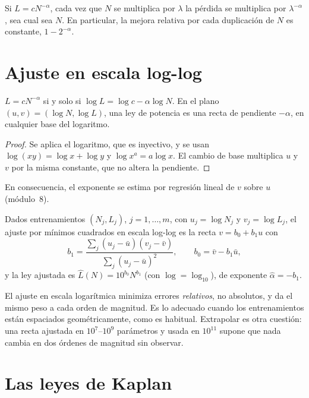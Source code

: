 \begin{corolario}\label{cor:factor}
Si $L=cN^{-\alpha}$, cada vez que $N$ se multiplica por $\lambda$ la pérdida se multiplica por $\lambda^{-\alpha}$, sea cual sea $N$. En particular, la mejora relativa por cada duplicación de $N$ es constante, $1-2^{-\alpha}$.
\end{corolario}

\section{Ajuste en escala log-log}

\begin{proposicion}\label{prop:loglog}
$L=cN^{-\alpha}$ si y solo si $\log L=\log c-\alpha\log N$. En el plano $(u,v)=(\log N,\log L)$, una ley de potencia es una recta de pendiente $-\alpha$, en cualquier base del logaritmo.
\end{proposicion}

\begin{proof}
Se aplica el logaritmo, que es inyectivo, y se usan $\log(xy)=\log x+\log y$ y $\log x^{a}=a\log x$. El cambio de base multiplica $u$ y $v$ por la misma constante, que no altera la pendiente.
\end{proof}

En consecuencia, el exponente se estima por regresión lineal de $v$ sobre $u$ (módulo~8).

\begin{definicion}\label{def:ajuste}
Dados entrenamientos $(N_j,L_j)$, $j=1,\dots,m$, con $u_j=\log N_j$ y $v_j=\log L_j$, el ajuste por mínimos cuadrados en escala log-log es la recta $v=b_0+b_1u$ con
\[
b_1=\frac{\sum_j(u_j-\bar u)(v_j-\bar v)}{\sum_j(u_j-\bar u)^{2}},\qquad b_0=\bar v-b_1\bar u,
\]
y la ley ajustada es $\hat L(N)=10^{b_0}N^{b_1}$ (con $\log=\log_{10}$), de exponente $\hat\alpha=-b_1$.
\end{definicion}

\begin{observacion}
El ajuste en escala logarítmica minimiza errores \emph{relativos}, no absolutos, y da el mismo peso a cada orden de magnitud. Es lo adecuado cuando los entrenamientos están espaciados geométricamente, como es habitual. Extrapolar es otra cuestión: una recta ajustada en $10^{7}$--$10^{9}$ parámetros y usada en $10^{11}$ supone que nada cambia en dos órdenes de magnitud sin observar.
\end{observacion}

\section{Las leyes de Kaplan}

